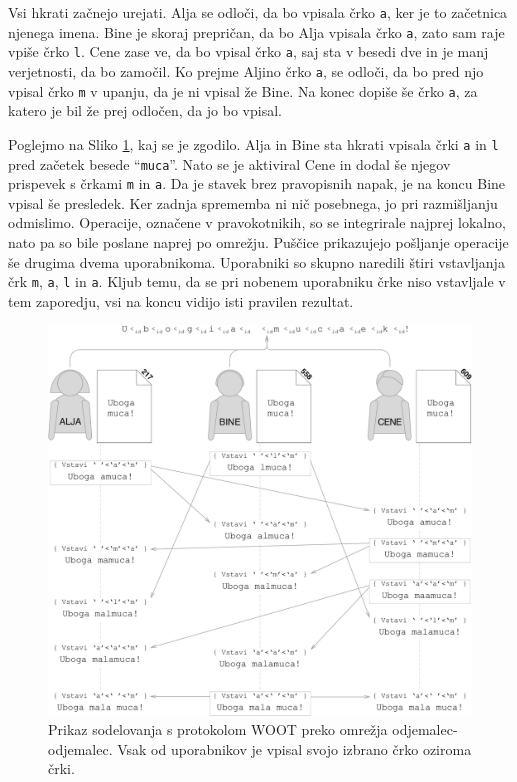 \documentclass[a4paper, 12pt, twoside]{book}
\begin{document}
Vsi hkrati začnejo urejati. Alja se odloči, da bo vpisala črko {\tt a}, ker je to začetnica njenega imena. Bine je skoraj prepričan, da bo Alja vpisala črko {\tt a}, zato sam raje vpiše črko {\tt l}. Cene zase ve, da bo vpisal črko {\tt a}, saj sta v besedi dve in je manj verjetnosti, da bo zamočil. Ko prejme Aljino črko {\tt a}, se odloči, da bo pred njo vpisal črko {\tt m} v upanju, da je ni vpisal že Bine. Na konec dopiše še črko {\tt a}, za katero je bil že prej odločen, da jo bo vpisal.

Poglejmo na Sliko \ref{woot6}, kaj se je zgodilo. Alja in Bine sta hkrati vpisala črki {\tt a} in {\tt l} pred začetek besede “{\tt muca}”. Nato se je aktiviral Cene in dodal še njegov prispevek s črkami {\tt m} in {\tt a}. Da je stavek brez pravopisnih napak, je na koncu Bine vpisal še presledek. Ker zadnja sprememba ni nič posebnega, jo pri razmišljanju odmislimo. Operacije, označene v pravokotnikih, so se integrirale najprej lokalno, nato pa so bile poslane naprej po omrežju. Puščice prikazujejo pošljanje operacije še drugima dvema uporabnikoma. Uporabniki so skupno naredili štiri vstavljanja črk {\tt m}, {\tt a}, {\tt l} in {\tt a}. Kljub temu, da se pri nobenem uporabniku črke niso vstavljale v tem zaporedju, vsi na koncu vidijo isti pravilen rezultat.

\begin{figure}[placement h]
\begin{center}
\includegraphics[width=16cm]{img/woot6.pdf}
\end{center}
\caption{Prikaz sodelovanja s protokolom WOOT preko omrežja odjemalec-odjemalec. Vsak od uporabnikov je vpisal svojo izbrano črko oziroma črki.}
\label{woot6}
\end{figure}
\end{document}
